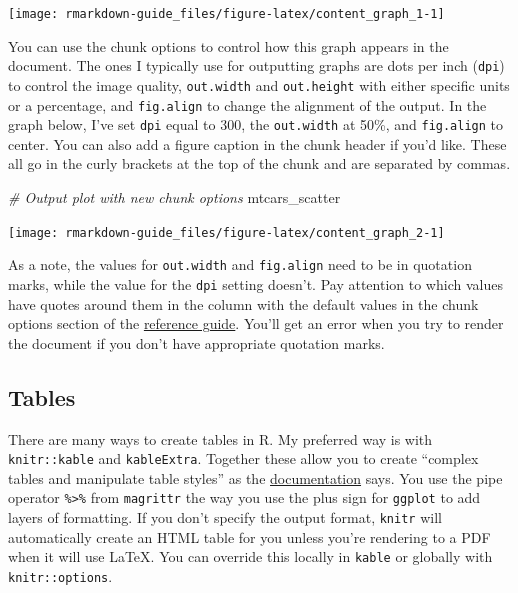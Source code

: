 \documentclass[
  openany]{book}
\newenvironment{Shaded}{\begin{snugshade}}{\end{snugshade}}
\newcommand{\CommentTok}[1]{\textcolor[rgb]{0.56,0.35,0.01}{\textit{#1}}}
\newcommand{\NormalTok}[1]{#1}
\begin{document}
\texttt{[image: rmarkdown-guide\_files/figure-latex/content\_graph\_1-1]}

You can use the chunk options to control how this graph appears in the document. The ones I typically use for outputting graphs are dots per inch (\texttt{dpi}) to control the image quality, \texttt{out.width} and \texttt{out.height} with either specific units or a percentage, and \texttt{fig.align} to change the alignment of the output. In the graph below, I've set \texttt{dpi} equal to 300, the \texttt{out.width} at 50\%, and \texttt{fig.align} to center. You can also add a figure caption in the chunk header if you'd like. These all go in the curly brackets at the top of the chunk and are separated by commas.

\begin{Shaded}
\begin{Highlighting}[]
\CommentTok{# Output plot with new chunk options}
\NormalTok{mtcars_scatter}
\end{Highlighting}
\end{Shaded}

\begin{center}\texttt{[image: rmarkdown-guide\_files/figure-latex/content\_graph\_2-1]} \end{center}

As a note, the values for \texttt{out.width} and \texttt{fig.align} need to be in quotation marks, while the value for the \texttt{dpi} setting doesn't. Pay attention to which values have quotes around them in the column with the default values in the chunk options section of the \href{https://rstudio.com/wp-content/uploads/2015/03/rmarkdown-reference.pdf}{reference guide}. You'll get an error when you try to render the document if you don't have appropriate quotation marks.

\hypertarget{tables}{%
\subsection{Tables}\label{tables}}

There are many ways to create tables in R. My preferred way is with \texttt{knitr::kable} and \texttt{kableExtra}. Together these allow you to create ``complex tables and manipulate table styles'' as the \href{https://cran.r-project.org/web/packages/kableExtra/vignettes/awesome_table_in_html.html}{documentation} says. You use the pipe operator \texttt{\%\textgreater{}\%} from \texttt{magrittr} the way you use the plus sign for \texttt{ggplot} to add layers of formatting. If you don't specify the output format, \texttt{knitr} will automatically create an HTML table for you unless you're rendering to a PDF when it will use LaTeX. You can override this locally in \texttt{kable} or globally with \texttt{knitr::options}.
\end{document}
